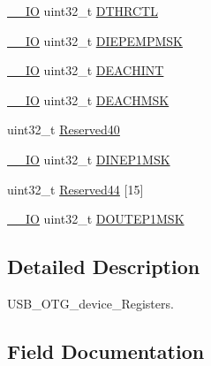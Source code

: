 \begin{DoxyCompactItemize}
\item 
\hyperlink{core__sc300_8h_aec43007d9998a0a0e01faede4133d6be}{\+\_\+\+\_\+\+IO} uint32\+\_\+t \hyperlink{struct_u_s_b___o_t_g___device_type_def_af0a7a07413a095432031eddc900031cd}{D\+T\+H\+R\+C\+TL}
\item 
\hyperlink{core__sc300_8h_aec43007d9998a0a0e01faede4133d6be}{\+\_\+\+\_\+\+IO} uint32\+\_\+t \hyperlink{struct_u_s_b___o_t_g___device_type_def_a6dca86482073d69a44c8e0e3a5efe068}{D\+I\+E\+P\+E\+M\+P\+M\+SK}
\item 
\hyperlink{core__sc300_8h_aec43007d9998a0a0e01faede4133d6be}{\+\_\+\+\_\+\+IO} uint32\+\_\+t \hyperlink{struct_u_s_b___o_t_g___device_type_def_a881208a5819f6a8bfb1f16a2d7cd05a1}{D\+E\+A\+C\+H\+I\+NT}
\item 
\hyperlink{core__sc300_8h_aec43007d9998a0a0e01faede4133d6be}{\+\_\+\+\_\+\+IO} uint32\+\_\+t \hyperlink{struct_u_s_b___o_t_g___device_type_def_ab10e5be5517065dccac3d098cc1b9894}{D\+E\+A\+C\+H\+M\+SK}
\item 
uint32\+\_\+t \hyperlink{struct_u_s_b___o_t_g___device_type_def_a4356045c881b1f037c3016473e580679}{Reserved40}
\item 
\hyperlink{core__sc300_8h_aec43007d9998a0a0e01faede4133d6be}{\+\_\+\+\_\+\+IO} uint32\+\_\+t \hyperlink{struct_u_s_b___o_t_g___device_type_def_a6dccbd3d18fe0e4e552aefc9f6f469fa}{D\+I\+N\+E\+P1\+M\+SK}
\item 
uint32\+\_\+t \hyperlink{struct_u_s_b___o_t_g___device_type_def_a6bb6a88a8d92f9cb65d104f40934844b}{Reserved44} \mbox{[}15\mbox{]}
\item 
\hyperlink{core__sc300_8h_aec43007d9998a0a0e01faede4133d6be}{\+\_\+\+\_\+\+IO} uint32\+\_\+t \hyperlink{struct_u_s_b___o_t_g___device_type_def_aabe0c08efd8c18aa1f85e4a38a3d2469}{D\+O\+U\+T\+E\+P1\+M\+SK}
\end{DoxyCompactItemize}


\subsection{Detailed Description}
U\+S\+B\+\_\+\+O\+T\+G\+\_\+device\+\_\+\+Registers. 

\subsection{Field Documentation}
\mbox{\label{struct_u_s_b___o_t_g___device_type_def_a5d28aaa3ea2e4e2246f9ba7025c6a8e7}} 
